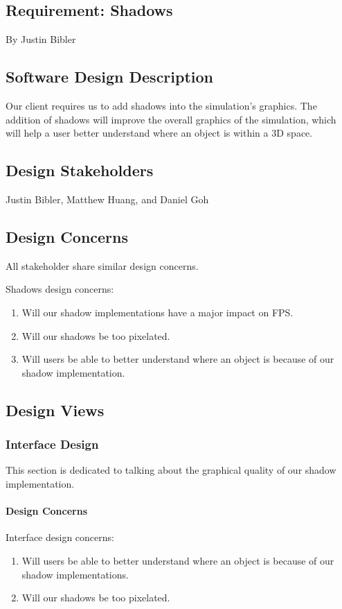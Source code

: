 \documentclass[10pt,journal,compsoc,draftclsnofoot]{IEEEtran}
\begin{document}
\begin{flushleft}
\newpage

\section{Requirement: Shadows}
\large{By Justin Bibler}

\normalsize
\subsection{Software Design Description}
Our client requires us to add shadows into the simulation's graphics.
The addition of shadows will improve the overall graphics of the simulation, which will help a user better understand where an object is within a 3D space.

\subsection{Design Stakeholders}
Justin Bibler, Matthew Huang, and Daniel Goh

\subsection{Design Concerns}
All stakeholder share similar design concerns.

Shadows design concerns:
\begin{enumerate}
\item Will our shadow implementations have a major impact on FPS.
\item Will our shadows be too pixelated.
\item Will users be able to better understand where an object is because of our shadow implementation.
\end{enumerate}

\newpage

\subsection{Design Views}
\subsubsection{Interface Design}
This section is dedicated to talking about the graphical quality of our shadow implementation.

\paragraph{Design Concerns}
Interface design concerns:
\begin{enumerate}
\item Will users be able to better understand where an object is because of our shadow implementations.
\item Will our shadows be too pixelated.
\end{enumerate}


\end{flushleft}
\end{document}
